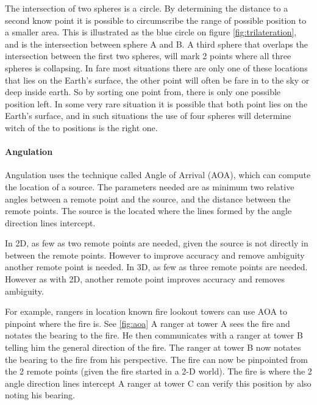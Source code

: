  The intersection of two spheres is a circle. By determining the distance to a second know point it is possible to circumscribe the range of possible position to a smaller area.
  This is illustrated as the blue circle on figure \ref{fig:trilateration}, and is the intersection between sphere A and B.
  A third sphere that overlaps the intersection between the first two spheres, will mark 2 points where all three spheres is collapsing. In fare most situations there are only one of these locations that lies on the Earth's surface, the other point will often be fare in to the sky or deep inside earth. So by sorting one point from, there is only one possible position left. 
  In some very rare situation it is possible that both point lies on the Earth's surface, and in such situations the use of four spheres will determine witch of the to positions is the right one.



  \paragraph{Angulation}

  Angulation uses the technique called Angle of Arrival (AOA), which can compute the location of a source. The parameters needed are as minimum two relative angles between a remote point and the source, and the distance between the remote points. The source is the located where the lines formed by the angle direction lines intercept. 

  In 2D, as few as two remote points are needed, given the source is not directly in between the remote points. However to improve accuracy and remove ambiguity  another remote point is needed. In 3D, as few as three remote points are needed. However as with 2D, another remote point improves accuracy and removes ambiguity. \cite{survey_pos, Sun2009, Boontrai2009}

  For example, rangers in location known fire lookout towers can use AOA to pinpoint where the fire is. See \cref{fig:aoa} A ranger at tower A sees the fire and notates the bearing to the fire. He then communicates with a ranger at tower B telling him the general direction of the fire. The ranger at tower B now notates the bearing to the fire from his perspective. The fire can now be pinpointed from the 2 remote points (given the fire started in a 2-D world). The fire is where the 2 angle direction lines intercept A ranger at tower C can verify this position by also noting his bearing. \cite{compassdude_triangulation}

